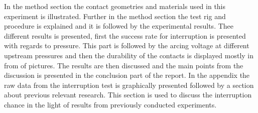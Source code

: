 \documentclass[10pt,a4paper,twoside]{article}
\begin{document}
In the method section the contact geometries and materials used in this experiment is illustrated. Further in the method section the test rig and procedure is explained and it is followed by the experimental results. Thee different results is presented, first the success rate for interruption is presented with regards to pressure. This part is followed by the arcing voltage at different upstream pressures and then the durability of the contacts is displayed mostly in from of pictures. The results are then discussed and the main points from the discussion is presented in the conclusion part of the report. In the appendix the raw data from the interruption test is graphically presented followed by a section about previous relevant research. This section is used to discuss the interruption chance in the light of results from previously conducted experiments.
\end{document}
